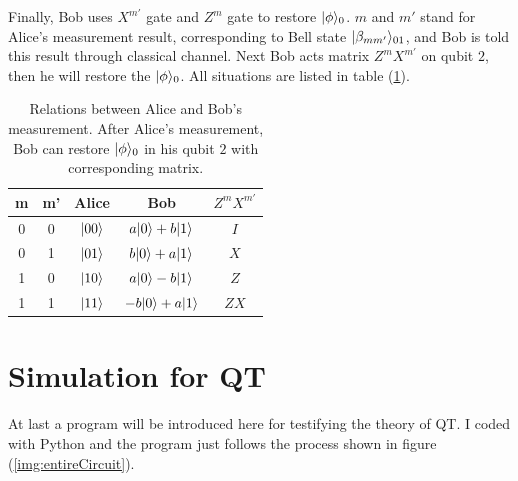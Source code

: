 		Finally, Bob uses $X^{m'}$ gate and $Z^{m}$ gate to restore $|{\phi} \rangle_0$. $m$ and $m'$ 
		stand for Alice's measurement result, corresponding to Bell state $|{\beta_{mm'}} \rangle_{01}$, 
		and Bob is told this result through classical channel. Next Bob acts matrix $Z^{m}X^{m'}$ on
		qubit $2$, then he will restore the $|{\phi} \rangle_0$. All situations are listed in table (\ref{tab:measure}).
		\begin{table}
		\centering			\begin{tabular}{c c c c c}
			\toprule
			m  &  m' &  Alice           &  Bob      &  $Z^{m}X^{m'}$ \\
			\midrule
			0  &  0  &  $|{00} \rangle$      &  $a|{0} \rangle+b|{1} \rangle$  &  $I$ \\
			0  &  1  &  $|{01} \rangle$      &  $b|{0} \rangle+a|{1} \rangle$  &  $X$ \\
			1  &  0  &  $|{10} \rangle$      &  $a|{0} \rangle-b|{1} \rangle$  &  $Z$ \\
			1  &  1  &  $|{11} \rangle$      &  $-b|{0} \rangle+a|{1} \rangle$ &  $ZX$ \\
			\bottomrule
			\end{tabular}
			\caption{Relations between Alice and Bob's measurement. After Alice's measurement, Bob can restore $|{\phi} \rangle_0$ in his qubit $2$ with corresponding matrix.}
			\label{tab:measure}
		\end{table}

\section{Simulation for QT}
	At last a program will be introduced here for testifying the theory of QT. I coded with Python 
	and the program just follows the process shown in figure (\ref{img:entireCircuit}).


